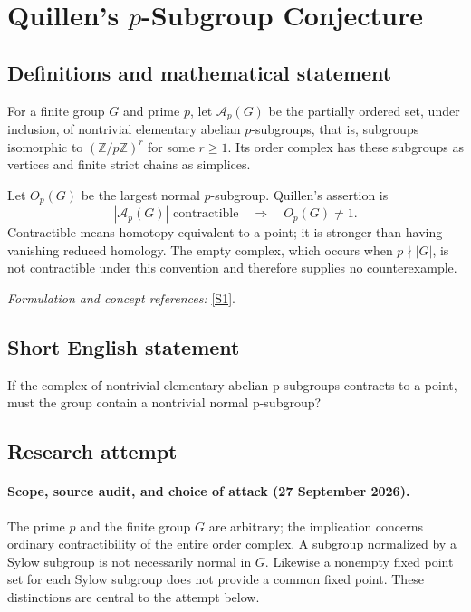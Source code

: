 \documentclass[11pt]{article}
\begin{document}
\section*{\texorpdfstring{Quillen's $p$-Subgroup Conjecture}{Quillen's \$p\$-Subgroup Conjecture}}\label{30002059}
\subsection{Definitions and mathematical statement}
For a finite group $G$ and prime $p$, let $\mathcal A_p(G)$ be the partially ordered set, under inclusion, of nontrivial elementary abelian $p$-subgroups, that is, subgroups isomorphic to $({\mathbb{Z}}/p{\mathbb{Z}})^r$ for some $r\ge1$. Its order complex has these subgroups as vertices and finite strict chains as simplices.

Let $O_p(G)$ be the largest normal $p$-subgroup. Quillen's assertion is
\[
 |\mathcal A_p(G)|\text{ contractible}
                   \quad\Longrightarrow\quad O_p(G)\ne1.
\]
Contractible means homotopy equivalent to a point; it is stronger than having vanishing reduced homology. The empty complex, which occurs when $p\nmid|G|$, is not contractible under this convention and therefore supplies no counterexample.
\par\smallskip\textit{Formulation and concept references:} \href{https://eprints.lancs.ac.uk/id/eprint/158837/1/dm_rev9.pdf}{[S1]}.

\subsection{Short English statement}
If the complex of nontrivial elementary abelian p-subgroups contracts to a point, must the group contain a nontrivial normal p-subgroup?
\subsection{Research attempt}

\paragraph{Scope, source audit, and choice of attack (27 September 2026).}
The prime $p$ and the finite group $G$ are arbitrary; the implication concerns
ordinary contractibility of the entire order complex. A subgroup normalized by
a Sylow subgroup is not necessarily normal in $G$. Likewise a nonempty fixed
point set for each Sylow subgroup does not provide a common fixed point.
These distinctions are central to the attempt below.
\end{document}
